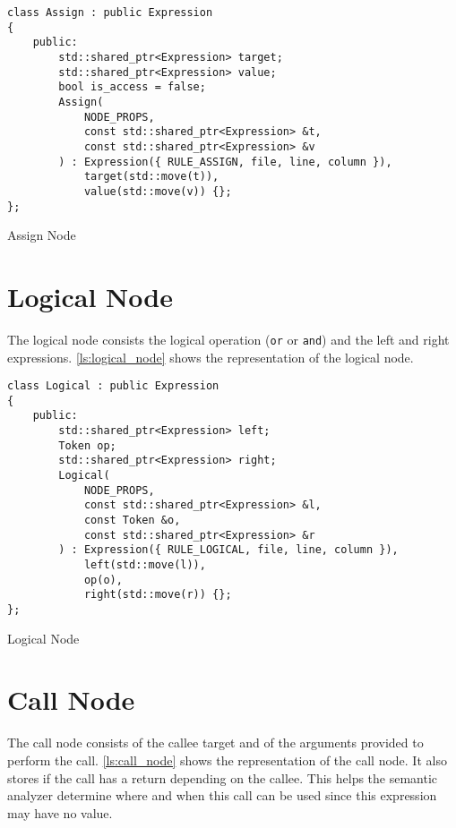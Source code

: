 \begin{listing}[H]
\begin{verbatim}
class Assign : public Expression
{
    public:
        std::shared_ptr<Expression> target;
        std::shared_ptr<Expression> value;
        bool is_access = false;
        Assign(
            NODE_PROPS,
            const std::shared_ptr<Expression> &t,
            const std::shared_ptr<Expression> &v
        ) : Expression({ RULE_ASSIGN, file, line, column }),
            target(std::move(t)),
            value(std::move(v)) {};
};
\end{verbatim}
\caption{Assign Node}
\label{ls:assign_node}
\end{listing}

\section{Logical Node}

The logical node consists the logical operation (\texttt{or} or \texttt{and}) and the left and right expressions.
\autoref{ls:logical_node} shows the representation of the logical node.

\begin{listing}[H]
\begin{verbatim}
class Logical : public Expression
{
    public:
        std::shared_ptr<Expression> left;
        Token op;
        std::shared_ptr<Expression> right;
        Logical(
            NODE_PROPS,
            const std::shared_ptr<Expression> &l,
            const Token &o,
            const std::shared_ptr<Expression> &r
        ) : Expression({ RULE_LOGICAL, file, line, column }),
            left(std::move(l)),
            op(o),
            right(std::move(r)) {};
};
\end{verbatim}
\caption{Logical Node}
\label{ls:logical_node}
\end{listing}

\section{Call Node}

The call node consists of the callee target and of the arguments provided to perform the call.
\autoref{ls:call_node} shows the representation of the call node. It also stores if the call has a return
depending on the callee. This helps the semantic analyzer determine where and when this call can be used since
this expression may have no value.

